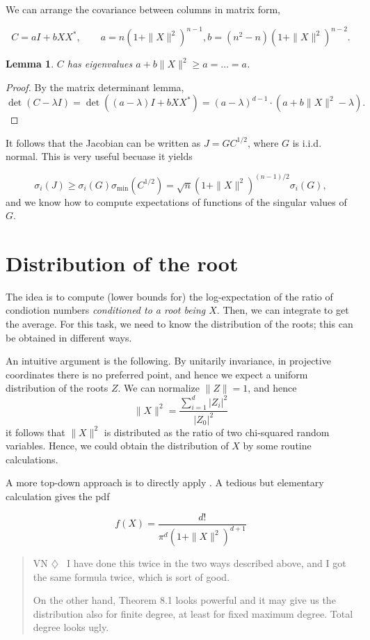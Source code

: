 \documentclass[12pt]{article}
\newenvironment{vn}{\begin{quote}\color{myviolet} \small\sf VN $\diamondsuit$~}{\end{quote}}
\newtheorem{lemma}{Lemma}[section]
\begin{document}
We can arrange the covariance between columns in matrix form,

\[  C   = a I + b X X^*, \qquad a=n(1+\|X\|^2)^{n-1}, b = (n^2-n) (1+\| X \|^2)^{n-2}.  \]
\begin{lemma}
$C$ has eigenvalues $a+b \|X\|^2 \geq a = \dots = a$.
\end{lemma}
\begin{proof}
By the matrix determinant lemma,
\[  \det(C-\lambda I) = \det ( (a-\lambda)I + b XX^*) = (a-\lambda)^{d-1} \cdot (a + b \| X\|^2- \lambda) .\]
\end{proof}

It follows that the Jacobian can be written as $J=G C^{1/2}$, where $G$ is i.i.d. normal. This is very useful becuase it yields

\[   \sigma_i(J) \geq \sigma_i(G) \sigma_{\min}(C^{1/2}) = \sqrt{n} (1+\|X\|^2)^{(n-1)/2} \sigma_i(G),\]
and we know how to compute expectations of functions of the singular values of $G$.


\section*{Distribution of the root}

The idea is to compute (lower bounds for) the log-expectation of the ratio of condiotion numbers \emph{conditioned to a root being $X$}. Then, we can integrate to get the average. For this task, we need to know the distribution of the roots; this can be obtained in different ways.

An intuitive argument is the following. By unitarily invariance, in projective coordinates there is no preferred point, and hence we expect a uniform distribution of the roots $Z$. We can normalize $\| Z \|=1$, and hence
\[  \| X \|^2 = \frac{\sum_{i=1}^d |Z_i|^2}{|Z_0|^2}  \]
it follows that $\|X\|^2$ is distributed as the ratio of two chi-squared random variables. Hence, we could obtain the distribution of $X$ by some routine calculations.

A more top-down approach is to directly apply \cite[Theorem 8.1]{EK}. A tedious but elementary calculation gives the pdf

\[ f(X) =  \frac{d!}{\pi^d (1 + \|X\|^2)^{d+1}} \]

\begin{vn}
    I have done this twice in the two ways described above, and I got the same  formula twice, which is sort of good.

    On the other hand, Theorem 8.1 looks powerful and it may give us the distribution also for finite degree, at least for fixed maximum degree. Total degree looks ugly.
\end{vn}
\end{document}

